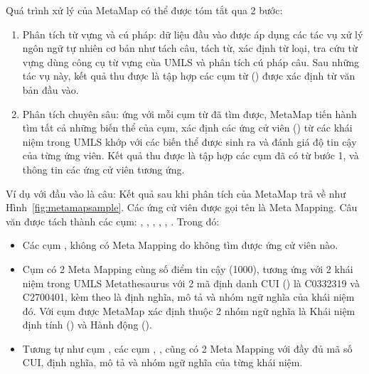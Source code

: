 Quá trình xử lý của MetaMap có thể được tóm tắt qua 2 bước:
\begin{enumerate}
\item Phân tích từ vựng và cú pháp: dữ liệu đầu vào được áp dụng các tác vụ xử lý ngôn ngữ tự nhiên cơ bản như tách câu, tách từ, xác định từ loại, tra cứu từ vựng dùng công cụ từ vựng của UMLS và phân tích cú pháp câu. Sau những tác vụ này, kết quả thu được là tập hợp các cụm từ () được xác định từ văn bản đầu vào.
\item Phân tích chuyên sâu: ứng với mỗi cụm từ đã tìm được, MetaMap tiến hành tìm tất cả những biến thể của cụm, xác định các ứng cử viên () từ các khái niệm trong UMLS khớp với các biến thể được sinh ra và đánh giá độ tin cậy của từng ứng viên. Kết quả thu được là tập hợp các cụm đã có từ bước 1, và thông tin các ứng cử viên tương ứng.
\end{enumerate}

Ví dụ với đầu vào là câu:  Kết quả sau khi phân tích của MetaMap trả về như Hình~\ref{fig:metamapsample}. Các ứng cử viên được gọi tên là Meta Mapping. Câu văn được tách thành các cụm: , , , , , . Trong đó:
\begin{itemize}
\item Các cụm ,  không có Meta Mapping do không tìm được ứng cử viên nào.
\item Cụm  có 2 Meta Mapping cùng số điểm tin cậy (1000), tương ứng với 2 khái niệm trong UMLS Metathesaurus với 2 mã định danh CUI () là C0332319 và C2700401, kèm theo là định nghĩa, mô tả và nhóm ngữ nghĩa của khái niệm đó. Với cụm  được MetaMap xác định thuộc 2 nhóm ngữ nghĩa là Khái niệm định tính () và Hành động ().
\item Tương tự như cụm , các cụm , ,  cũng có 2 Meta Mapping với đầy đủ mã số CUI, định nghĩa, mô tả và nhóm ngữ nghĩa của từng khái niệm.
\end{itemize}

